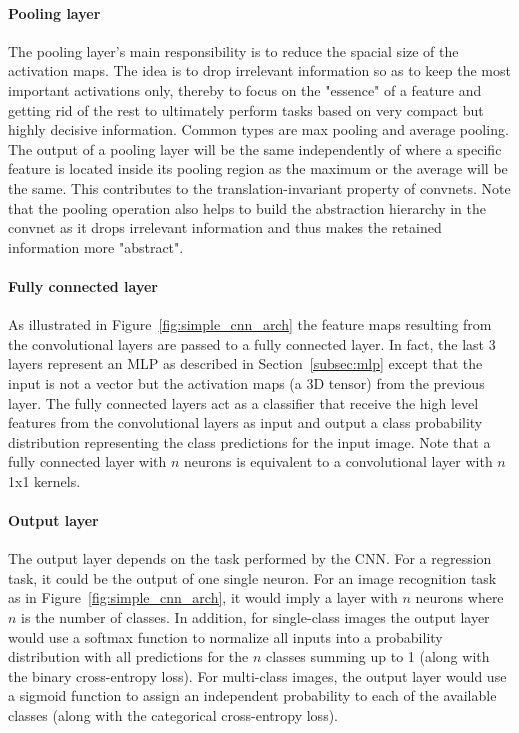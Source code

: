 \documentclass[a4paper,12pt]{report}
\begin{document}
\paragraph{Pooling layer            } The pooling layer's main responsibility is to reduce the spacial size of the activation maps. The idea is to drop irrelevant information so as to keep the most important activations only, thereby to focus on the "essence" of a feature and getting rid of the rest to ultimately perform tasks based on very compact but highly decisive information. Common types are max pooling and average pooling. The output of a pooling layer will be the same independently of where a specific feature is located inside its pooling region as the maximum or the average will be the same. This contributes to the translation-invariant property of convnets. Note that the pooling operation also helps to build the abstraction hierarchy in the convnet as it drops irrelevant information and thus makes the retained information more "abstract". 

\paragraph{Fully connected layer    } As illustrated in Figure~\ref{fig:simple_cnn_arch} the feature maps resulting from the convolutional layers are passed to a fully connected layer. In fact, the last 3 layers represent an MLP as described in Section~\ref{subsec:mlp} except that the input is not a vector but the activation maps (a 3D tensor) from the previous layer. The fully connected layers act as a classifier that receive the high level features from the convolutional layers as input and output a class probability distribution representing the class predictions for the input image. Note that a fully connected layer with $n$ neurons is equivalent to a convolutional layer with $n$ 1x1 kernels.

\paragraph{Output layer} 
The output layer depends on the task performed by the CNN. For a regression task, it could be the output of one single neuron. For an image recognition task as in Figure~\ref{fig:simple_cnn_arch}, it would imply a layer with $n$ neurons where $n$ is the number of classes. In addition, for single-class images the output layer would use a softmax function to normalize all inputs into a probability distribution with all predictions for the $n$ classes summing up to 1 (along with the binary cross-entropy loss).  For multi-class images, the output layer would use a sigmoid function to assign an independent probability to each of the available classes (along with the categorical cross-entropy loss).
\end{document}
